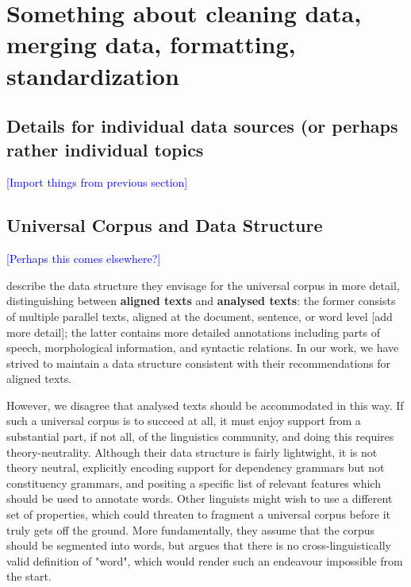 \section{Something about cleaning data, merging data, formatting, standardization}

\subsection{Details for individual data sources (or perhaps rather individual topics}

\textcolor{blue}{[Import things from previous section]}




\subsection{Universal Corpus and Data Structure} \label{sec:structure}

\textcolor{blue}{[Perhaps this comes elsewhere?]}

 describe the data structure they envisage for the universal corpus in more detail, distinguishing between \textbf{aligned texts} and \textbf{analysed texts}: the former consists of multiple parallel texts, aligned at the document, sentence, or word level [add more detail]; the latter contains more detailed annotations including parts of speech, morphological information, and syntactic relations. In our work, we have strived to maintain a data structure consistent with their recommendations for aligned texts.

However, we disagree that analysed texts should be accommodated in this way. If such a universal corpus is to succeed at all, it must enjoy support from a substantial part, if not all, of the linguistics community, and doing this requires theory-neutrality. Although their data structure is fairly lightwight, it is not theory neutral, explicitly encoding support for dependency grammars but not constituency grammars, and positing a specific list of relevant features which should be used to annotate words. Other linguists might wish to use a different set of properties, which could threaten to fragment a universal corpus before it truly gets off the ground. More fundamentally, they assume that the corpus should be segmented into words, but  argues that there is no cross-linguistically valid definition of "word", which would render such an endeavour impossible from the start.

